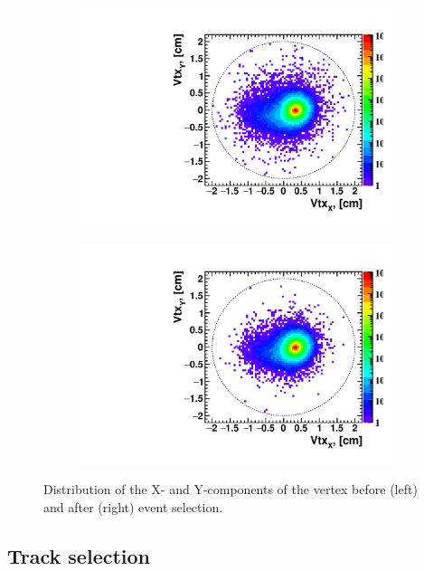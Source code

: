 \begin{figure}[ht]
    \begin{subfigure}{.49\textwidth}
        \centering
        \includegraphics[width=1.\linewidth]{Figures/VtxXY0.pdf}
    \end{subfigure}
    \begin{subfigure}{.49\textwidth}
        \centering
        \includegraphics[width=1.\linewidth]{Figures/VtxXY1.pdf}
    \end{subfigure}
    \caption{Distribution of the X- and Y-components of the vertex before (left) and after (right) event selection.}
    \label{fig:VtxXYCuts}
\end{figure}

\FloatBarrier
\subsection {Track selection}


